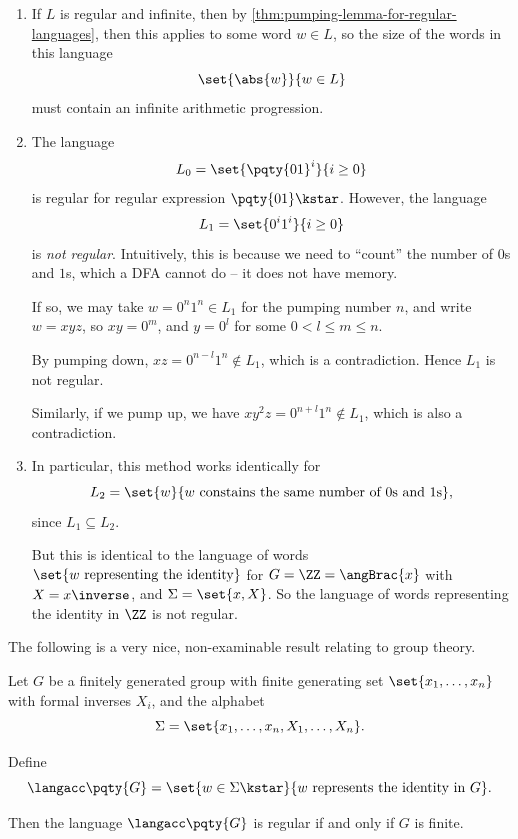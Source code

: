 \begin{examples*}
    \begin{enumerate}[label=(\alph*)]
        \item If \(L\) is regular and infinite, then by \autoref{thm:pumping-lemma-for-regular-languages}, then this applies to some word \(w \in L\), so the size of the words in this language
        \[
            \set{\abs{w}}{w \in L}
        \]
        must contain an infinite arithmetic progression.
        \item The language
        \[
            L_0 = \set{\pqty{01}^i}{i \geq 0}
        \]
        is regular for regular expression \(\pqty{01}\kstar\). However, the language
        \[
            L_1 = \set{0^i 1^i}{i \geq 0}
        \]
        is \emph{not regular}. Intuitively, this is because we need to ``count'' the number of \(0\)s and \(1\)s, which a DFA cannot do -- it does not have memory.

        If so, we may take \(w = 0^n 1^n \in L_1\) for the pumping number \(n\), and write \(w = xyz\), so \(xy = 0^m\), and \(y = 0^l\) for some \(0 < l \leq m \leq n\).

        By pumping down, \(xz = 0^{n - l} 1^n \notin L_1\), which is a contradiction. Hence \(L_1\) is not regular.

        Similarly, if we pump up, we have \(x y^2 z = 0^{n + l} 1^n \notin L_1\), which is also a contradiction.

        \item In particular, this method works identically for
        \[
            L_2 = \set{w}{w\text{ constains the same number of 0s and 1s}},
        \]
        since \(L_1 \subseteq L_2\).

        But this is identical to the language of words \(\set{w \text{ representing the identity}}\) for \(G = \ZZ = \angBrac{x}\) with \(X = x\inverse\), and \(\Sigma = \set{x, X}\). So the language of words representing the identity in \(\ZZ\) is not regular.
   \end{enumerate}
\end{examples*}

\small

The following is a very nice, non-examinable result relating to group theory.

\begin{theorem}
    \label{thm:anisimov-theorem}%
    Let \(G\) be a finitely generated group with finite generating set \(\set{x_1, \ldots, x_n}\) with formal inverses \(X_i\), and the alphabet
    \[
        \Sigma = \set{x_1, \ldots, x_n, X_1, \ldots, X_n}.
    \]

    Define 
    \[
        \langacc\pqty{G} = \set{w \in \Sigma\kstar}{w\text{ represents the identity in }G}.
    \]

    Then the language \(\langacc\pqty{G}\) is regular if and only if \(G\) is finite.
\end{theorem}

